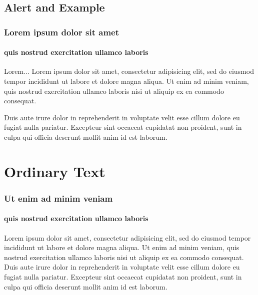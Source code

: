 \documentclass[trans]{beamer}
\begin{document}
\subsection{Alert and Example}
\begin{frame}
	\frametitle{Lorem ipsum dolor sit amet}
	\framesubtitle{quis nostrud exercitation ullamco laboris}
	
	\begin{alertblock}{Lorem...}
	Lorem \alert{ipsum dolor sit amet}, consectetur adipisicing elit, sed do eiusmod \alert{tempor incididunt ut labore} et dolore magna aliqua. Ut enim ad minim veniam, \alert{quis nostrud exercitation ullamco laboris} nisi ut aliquip ex ea commodo consequat. 
	\end{alertblock}
	\medskip
	\begin{example}
		Duis aute irure \alert{dolor in reprehenderit in voluptate} velit esse cillum dolore eu fugiat nulla pariatur. Excepteur sint occaecat cupidatat non proident, sunt in culpa qui officia deserunt mollit anim id est laborum.
	\end{example}
\end{frame}

\section{Ordinary Text}
\begin{frame}
	\frametitle{Ut enim ad minim veniam}
	\framesubtitle{quis nostrud exercitation ullamco laboris}

	Lorem ipsum dolor sit amet, consectetur adipisicing elit, sed do eiusmod tempor incididunt ut labore et dolore magna aliqua. Ut enim ad minim veniam, quis nostrud exercitation ullamco laboris nisi ut aliquip ex ea commodo consequat. Duis aute irure dolor in reprehenderit in voluptate velit esse cillum dolore eu fugiat nulla pariatur. Excepteur sint occaecat cupidatat non proident, sunt in culpa qui officia deserunt mollit anim id est laborum.
\end{frame}
\end{document}
